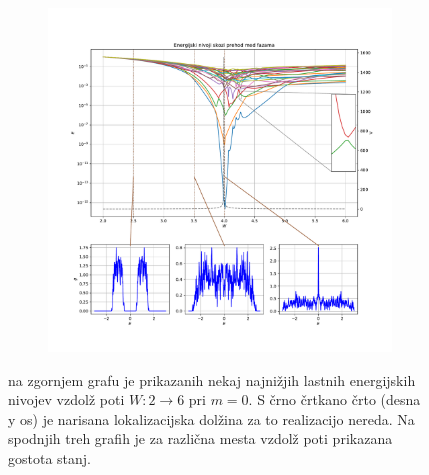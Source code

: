\begin{figure}[H]
\centering
\begin{subfigure}{\textwidth}
\includegraphics[trim=0 0 0 100,clip,width=\linewidth]{Figures/Nicegraph.pdf}
\end{subfigure}
\caption{na zgornjem grafu je prikazanih nekaj najnižjih lastnih energijskih nivojev vzdolž poti $W: 2 \to 6$ pri $m=0$. S črno črtkano črto (desna y os) je narisana lokalizacijska dolžina za to realizacijo nereda. Na spodnjih treh grafih je za različna mesta vzdolž poti prikazana gostota stanj.}
\label{fig:Nicegraph}
\end{figure}

